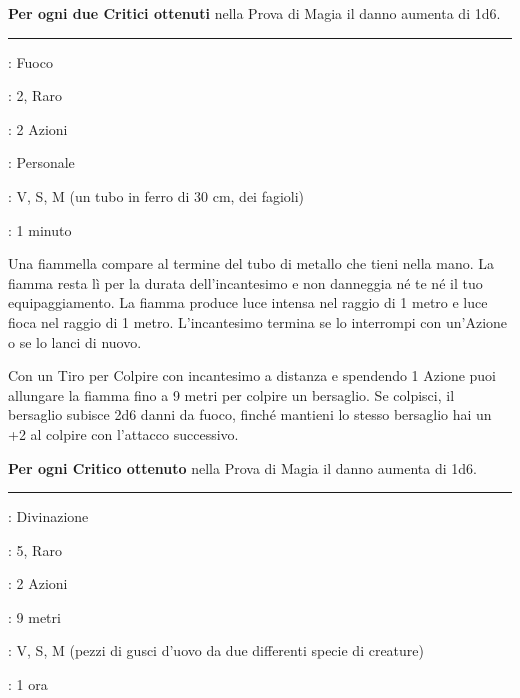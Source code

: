 \begin{multicols}{2}
\textbf{Per ogni due Critici ottenuti} nella Prova di Magia il danno aumenta di 1d6.

\smallskip\noindent\rule{\linewidth}{2pt} \hypertarget{Lanciafiamme}{}\medskip{}
\noindent
\begin{description}[noitemsep, topsep=0pt, parsep=0pt, partopsep=0pt, leftmargin=0cm, labelwidth=2.8cm]
	\item[\textbf{Lista di Magia}]: Fuoco
	\item[\textbf{Livello}]: 2, Raro
	\item[\textbf{T. di Lancio}]: 2 Azioni
	\item[\textbf{Gittata}]: Personale
	\item[\textbf{Componenti}]: V, S, M (un tubo in ferro di 30 cm, dei fagioli)
	\item[\textbf{Durata}]: 1 minuto
\end{description}

Una fiammella compare al termine del tubo di metallo che tieni nella mano. La fiamma resta lì per la durata dell'incantesimo e non danneggia né te né il tuo equipaggiamento. La fiamma produce luce intensa nel raggio di 1 metro e luce fioca nel raggio di 1 metro. L'incantesimo termina se lo interrompi con un'Azione o se lo lanci di nuovo.

Con un Tiro per Colpire con incantesimo a distanza e spendendo 1 Azione puoi allungare la fiamma fino a 9 metri per colpire un bersaglio. Se colpisci, il bersaglio subisce 2d6 danni da fuoco, finché mantieni lo stesso bersaglio hai un +2 al colpire con l'attacco successivo.

\textbf{Per ogni Critico ottenuto} nella Prova di Magia il danno aumenta di 1d6.

\smallskip\noindent\rule{\linewidth}{2pt} \hypertarget{Legame Telepatico}{}\medskip{}
\noindent
\begin{description}[noitemsep, topsep=0pt, parsep=0pt, partopsep=0pt, leftmargin=0cm, labelwidth=2.8cm]
	\item[\textbf{Lista di Magia}]: Divinazione
	\item[\textbf{Livello}]: 5, Raro
	\item[\textbf{T. di Lancio}]: 2 Azioni
	\item[\textbf{Gittata}]: 9 metri
	\item[\textbf{Componenti}]: V, S, M (pezzi di gusci d'uovo da due differenti specie di creature)
	\item[\textbf{Durata}]: 1 ora
\end{description}


\end{multicols}
